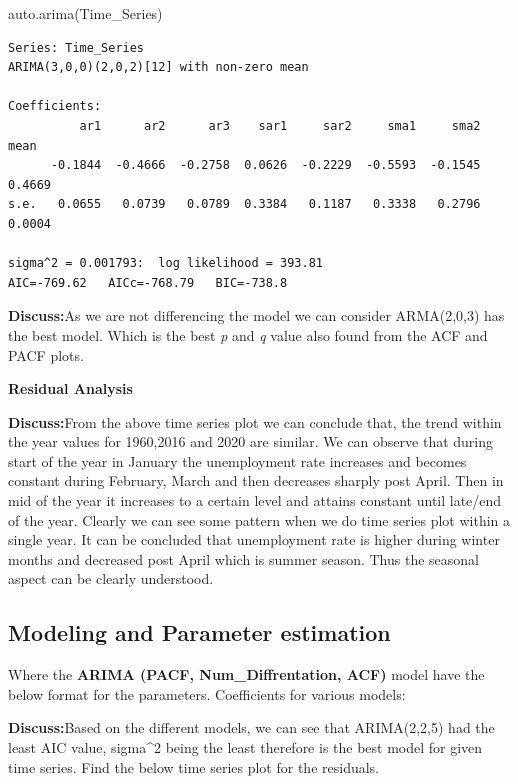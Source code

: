 \documentclass[
  onepage,
  openany]{scrbook}
\newenvironment{Shaded}{}{}
\newcommand{\FunctionTok}[1]{\textcolor[rgb]{0.02,0.16,0.49}{#1}}
\newcommand{\NormalTok}[1]{#1}
\begin{document}
\begin{Shaded}
\begin{Highlighting}[]
\FunctionTok{auto.arima}\NormalTok{(Time\_Series)}
\end{Highlighting}
\end{Shaded}

\begin{verbatim}
Series: Time_Series 
ARIMA(3,0,0)(2,0,2)[12] with non-zero mean 

Coefficients:
          ar1      ar2      ar3    sar1     sar2     sma1     sma2    mean
      -0.1844  -0.4666  -0.2758  0.0626  -0.2229  -0.5593  -0.1545  0.4669
s.e.   0.0655   0.0739   0.0789  0.3384   0.1187   0.3338   0.2796  0.0004

sigma^2 = 0.001793:  log likelihood = 393.81
AIC=-769.62   AICc=-768.79   BIC=-738.8
\end{verbatim}

\textbf{Discuss:}As we are not differencing the model we can consider
ARMA(2,0,3) has the best model. Which is the best \emph{p} and \emph{q}
value also found from the ACF and PACF plots.

\textbf{Residual Analysis}

\textbf{Discuss:}From the above time series plot we can conclude that,
the trend within the year values for 1960,2016 and 2020 are similar. We
can observe that during start of the year in January the unemployment
rate increases and becomes constant during February, March and then
decreases sharply post April. Then in mid of the year it increases to a
certain level and attains constant until late/end of the year. Clearly
we can see some pattern when we do time series plot within a single
year. It can be concluded that unemployment rate is higher during winter
months and decreased post April which is summer season. Thus the
seasonal aspect can be clearly understood.\\

\hypertarget{modeling-and-parameter-estimation}{%
\subsection{\texorpdfstring{\textbf{Modeling and Parameter
estimation}}{Modeling and Parameter estimation}}\label{modeling-and-parameter-estimation}}

\hfill\break
Where the \textbf{ARIMA (PACF, Num\_Diffrentation, ACF)} model have the
below format for the parameters. Coefficients for various models:

\textbf{Discuss:}Based on the different models, we can see that
ARIMA(2,2,5) had the least AIC value, sigma\^{}2 being the least
therefore is the best model for given time series. Find the below time
series plot for the residuals.
\end{document}
